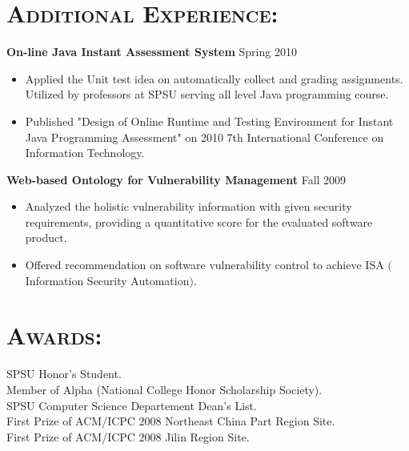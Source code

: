 \begin{resume}
\section{\textsc{Additional Experience:}}
\textbf{\newline On-line Java Instant Assessment System} \hfill Spring 2010
\begin{itemize}
	\item Applied the Unit test idea on automatically collect and grading assignments. Utilized by professors at SPSU serving all level Java programming course.
	\item Published "Design of Online Runtime and Testing Environment for Instant Java Programming Assessment" on 2010 7th International Conference on Information Technology.
\end{itemize}

\textbf{Web-based Ontology for Vulnerability Management} \hfill Fall 2009
\begin{itemize}
	\item Analyzed the holistic vulnerability information with given security requirements, 
providing a quantitative score for the evaluated software product.
	\item Offered recommendation on software vulnerability control to achieve ISA $($Information
Security Automation$)$.
\end{itemize}



\section{\textsc{Awards:}} 
\textbf{\newline}
SPSU Honor’s Student. \\
Member of Alpha (National College Honor Scholarship Society).  \\
SPSU Computer Science Departement Dean's List.\\
First Prize of ACM/ICPC 2008 Northeast China Part Region Site.	\\
First Prize of ACM/ICPC 2008 Jilin Region Site. 





\end{resume}

